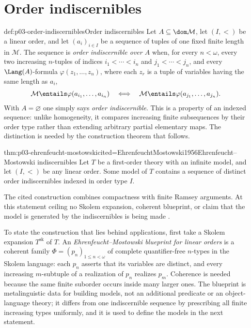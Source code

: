 


\section{Order indiscernibles}
\label{sec:p03-indiscernibles}

\begin{hbdefinition}{def:p03-order-indiscernibles}{Order indiscernibles}
Let \(A\subseteq\dom\mathcal M\), let \((I,<)\) be a linear order, and let
\((a_i)_{i\in I}\) be a sequence of tuples of one fixed finite length in
\(\mathcal M\).  The sequence is \emph{order indiscernible over \(A\)} when,
for every \(n<\omega\), every two increasing \(n\)-tuples of indices
\(i_1<\cdots<i_n\) and \(j_1<\cdots<j_n\), and every
\(\Lang(A)\)-formula \(\varphi(z_1,\ldots,z_n)\), where each \(z_r\) is a
tuple of variables having the same length as \(a_i\),
\[
 \mathcal M\entails\varphi(a_{i_1},\ldots,a_{i_n})
 \quad\Longleftrightarrow\quad
 \mathcal M\entails\varphi(a_{j_1},\ldots,a_{j_n}).
\]
With \(A=\varnothing\) one simply says \emph{order indiscernible}.  This is a
property of an indexed sequence: unlike homogeneity, it compares increasing
finite subsequences by their order type rather than extending arbitrary
partial elementary maps.  The distinction is needed by the construction
theorem that follows.
\end{hbdefinition}

\begin{hbtheorem}{thm:p03-ehrenfeucht-mostowski}{cited=EhrenfeuchtMostowski1956}{Ehrenfeucht--Mostowski indiscernibles}
Let \(T\) be a first-order theory with an infinite model, and let \((I,<)\)
be any linear order.  Some model of \(T\) contains a sequence of distinct
order indiscernibles indexed in order type \(I\).
\end{hbtheorem}

The cited construction combines compactness with finite Ramsey arguments.  At
this statement ceiling no Skolem expansion, coherent
blueprint, or claim that the model is generated by the indiscernibles is
being made \cite{EhrenfeuchtMostowski1956,Marker2002}.

To state the construction that lies behind applications, first take a
Skolem expansion \(T^{\mathrm{sk}}\) of \(T\).  An
\emph{Ehrenfeucht--Mostowski blueprint for linear orders} is a coherent
family \(\Phi=(p_n)_{1\leq n<\omega}\) of complete quantifier-free
\(n\)-types in the Skolem language: each \(p_n\) asserts that its variables
are distinct, and every increasing \(m\)-subtuple of a realization of
\(p_n\) realizes \(p_m\).  Coherence is needed because the same finite
suborder occurs inside many larger ones.  The blueprint is metalinguistic
data for building models, not an additional predicate or an object-language
theory; it differs from one indiscernible sequence by prescribing all finite
increasing types uniformly, and it is used to define the models in the next
statement.

